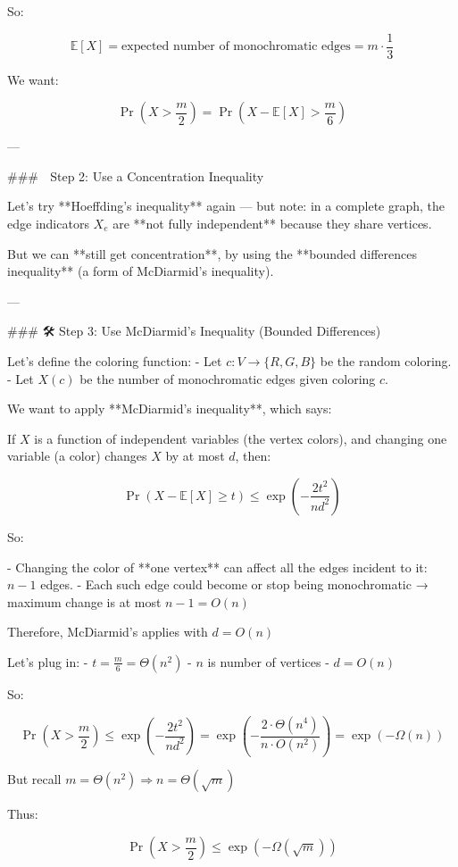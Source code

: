 So:

\[
\mathbb{E}[X] = \text{expected number of monochromatic edges} = m \cdot \frac{1}{3}
\]

We want:

\[
\Pr\left(X > \frac{m}{2} \right) = \Pr\left(X - \mathbb{E}[X] > \frac{m}{6} \right)
\]

---

### 🚀 Step 2: Use a Concentration Inequality

Let's try **Hoeffding's inequality** again — but note: in a complete graph, the edge indicators \( X_e \) are **not fully independent** because they share vertices.

But we can **still get concentration**, by using the **bounded differences inequality** (a form of McDiarmid's inequality).

---

### 🛠 Step 3: Use McDiarmid's Inequality (Bounded Differences)

Let's define the coloring function:
- Let \( c: V \to \{R, G, B\} \) be the random coloring.
- Let \( X(c) \) be the number of monochromatic edges given coloring \( c \).

We want to apply **McDiarmid's inequality**, which says:

If \( X \) is a function of independent variables (the vertex colors), and changing one variable (a color) changes \( X \) by at most \( d \), then:

\[
\Pr(X - \mathbb{E}[X] \ge t) \le \exp\left(-\frac{2t^2}{n d^2} \right)
\]

So:

- Changing the color of **one vertex** can affect all the edges incident to it: \( n-1 \) edges.
- Each such edge could become or stop being monochromatic → maximum change is at most \( n - 1 = O(n) \)

Therefore, McDiarmid's applies with \( d = O(n) \)

Let's plug in:
- \( t = \frac{m}{6} = \Theta(n^2) \)
- \( n \) is number of vertices
- \( d = O(n) \)

So:

\[
\Pr\left(X > \frac{m}{2}\right) \le \exp\left(-\frac{2t^2}{n d^2} \right)
= \exp\left(-\frac{2 \cdot \Theta(n^4)}{n \cdot O(n^2)}\right) 
= \exp\left(-\Omega(n)\right)
\]

But recall \( m = \Theta(n^2) \Rightarrow n = \Theta(\sqrt{m}) \)

Thus:

\[
\Pr\left(X > \frac{m}{2} \right) \le \exp(-\Omega(\sqrt{m}))
\]

